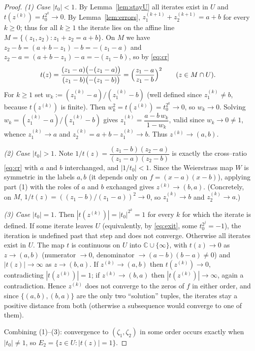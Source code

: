 \documentclass{amsart}
\theoremstyle{definition}
\theoremstyle{remark}
\newcommand{\C}{\mathbb{C}}
\begin{document}
\begin{proof}
\emph{(1) Case $|t_0|<1$.} By Lemma~\ref{lem:stayU} all iterates exist in $U$ and
$t(z^{(k)})=t_0^{2^k}\to 0$. By Lemma~\ref{lem:errors}, $z^{(k+1)}_1+z^{(k+1)}_2=a+b$ for
every $k\ge0$; thus for all $k\ge 1$ the iterate lies on the affine line
$M=\{(z_1,z_2):z_1+z_2=a+b\}$. On $M$ we have $z_2-b=(a+b-z_1)-b=-(z_1-a)$ and
$z_2-a=(a+b-z_1)-a=-(z_1-b)$, so by \eqref{eq:cr}
\begin{equation}\label{eq:tonM}
t(z)=\frac{(z_1-a)\bigl(-(z_1-a)\bigr)}{(z_1-b)\bigl(-(z_1-b)\bigr)}
=\Bigl(\frac{z_1-a}{z_1-b}\Bigr)^2 \qquad (z\in M\cap U).
\end{equation}
For $k\ge 1$ set $w_k:=(z^{(k)}_1-a)/(z^{(k)}_1-b)$ (well defined since $z^{(k)}_1\neq b$,
because $t(z^{(k)})$ is finite). Then $w_k^2=t(z^{(k)})=t_0^{2^k}\to 0$, so $w_k\to 0$.
Solving $w_k=(z^{(k)}_1-a)/(z^{(k)}_1-b)$ gives $z^{(k)}_1=\dfrac{a-b\,w_k}{1-w_k}$, valid
since $w_k\to0\neq1$, whence $z^{(k)}_1\to a$ and $z^{(k)}_2=a+b-z^{(k)}_1\to b$. Thus
$z^{(k)}\to(a,b)$.

\emph{(2) Case $|t_0|>1$.} Note $1/t(z)=\dfrac{(z_1-b)(z_2-a)}{(z_1-a)(z_2-b)}$ is exactly
the cross--ratio \eqref{eq:cr} with $a$ and $b$ interchanged, and $|1/t_0|<1$. Since the
Weierstrass map $W$ is symmetric in the labels $a,b$ (it depends only on
$f=(x-a)(x-b)$), applying part (1) with the roles of $a$ and $b$ exchanged gives
$z^{(k)}\to(b,a)$. (Concretely, on $M$, $1/t(z)=((z_1-b)/(z_1-a))^2\to0$, so $z^{(k)}_1\to b$
and $z^{(k)}_2\to a$.)

\emph{(3) Case $|t_0|=1$.} Then $|t(z^{(k)})|=|t_0|^{2^k}=1$ for every $k$ for which the
iterate is defined. If some iterate leaves $U$ (equivalently, by \eqref{eq:exit}, some
$t_0^{2^j}=-1$), the iteration is undefined past that step and does not converge. Otherwise
all iterates exist in $U$. The map $t$ is continuous on $U$ into $\C\cup\{\infty\}$, with
$t(z)\to0$ as $z\to(a,b)$ (numerator $\to0$, denominator $\to(a-b)(b-a)\neq0$) and
$|t(z)|\to\infty$ as $z\to(b,a)$. If $z^{(k)}\to(a,b)$ then $t(z^{(k)})\to0$, contradicting
$|t(z^{(k)})|=1$; if $z^{(k)}\to(b,a)$ then $|t(z^{(k)})|\to\infty$, again a contradiction.
Hence $z^{(k)}$ does not converge to the zeros of $f$ in either order, and since
$\{(a,b),(b,a)\}$ are the only two ``solution'' tuples, the iterates stay a positive distance
from both (otherwise a subsequence would converge to one of them).

Combining (1)--(3): convergence to $(\zeta_1,\zeta_2)$ in some order occurs exactly when
$|t_0|\neq1$, so $E_2=\{z\in U:|t(z)|=1\}$.
\end{proof}
\end{document}
